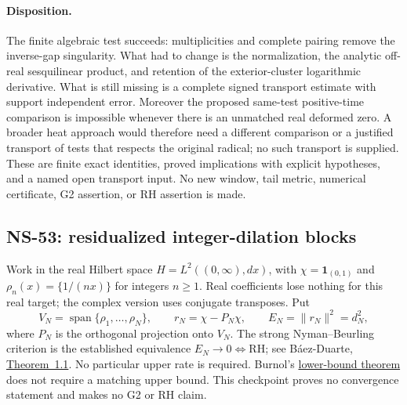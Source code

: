 \documentclass[11pt]{article}
\theoremstyle{remark}
\begin{document}
\paragraph{Disposition.}
The finite algebraic test succeeds: multiplicities and complete
pairing remove the inverse-gap singularity. What had to change is
the normalization, the analytic off-real sesquilinear product, and
retention of the exterior-cluster logarithmic derivative. What is
still missing is a complete signed transport estimate with support
independent error. Moreover the proposed same-test positive-time
comparison is impossible whenever there is an unmatched real
deformed zero. A broader heat approach would therefore need a
different comparison or a justified transport of tests that respects
the original radical; no such transport is supplied. These are
finite exact identities, proved implications with explicit hypotheses,
and a named open transport input. No new window, tail metric,
numerical certificate, G2 assertion, or RH assertion is made.


\subsection{NS-53: residualized integer-dilation blocks}
\label{sec:ns53-nb-blocks}

Work in the real Hilbert space $H=L^2((0,\infty),dx)$, with
$\chi=\mathbf 1_{(0,1)}$ and $\rho_n(x)=\{1/(nx)\}$ for integers $n\geq1$.
Real coefficients lose nothing for this real target; the complex version
uses conjugate transposes. Put
\[
 V_N=\operatorname{span}\{\rho_1,\ldots,\rho_N\},\qquad
 r_N=\chi-P_N\chi,\qquad E_N=\|r_N\|^2=d_N^2,
\]
where $P_N$ is the orthogonal projection onto $V_N$.
The strong Nyman--Beurling criterion is the established equivalence
$E_N\to0\Longleftrightarrow\mathrm{RH}$; see B\'aez-Duarte,
\href{https://arxiv.org/abs/math/0202141}{Theorem~1.1}.
No particular upper rate is required. Burnol's
\href{https://doi.org/10.1006/aima.2001.2066}{lower-bound theorem}
does not require a matching upper bound. This checkpoint proves no
convergence statement and makes no G2 or RH claim.
\end{document}
